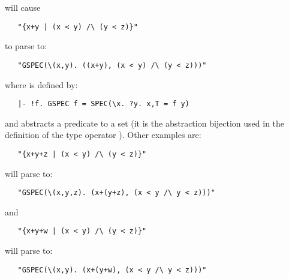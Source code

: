 \noindent will cause

\begin{hol}\begin{verbatim}
   "{x+y | (x < y) /\ (y < z)}"
\end{verbatim}\end{hol}

\noindent to parse to:

\begin{hol}\begin{verbatim}
   "GSPEC(\(x,y). ((x+y), (x < y) /\ (y < z)))"
\end{verbatim}\end{hol}

\noindent where  is defined by:

\begin{hol}\begin{verbatim}
   |- !f. GSPEC f = SPEC(\x. ?y. x,T = f y)
\end{verbatim}\end{hol}

\noindent and  abstracts a predicate to a set (it is the abstraction
bijection used in the definition of the type operator ).
Other examples are:

\begin{hol}\begin{verbatim}
   "{x+y+z | (x < y) /\ (y < z)}"
\end{verbatim}\end{hol}

\noindent will parse to:

\begin{hol}\begin{verbatim}
   "GSPEC(\(x,y,z). (x+(y+z), (x < y /\ y < z)))" 
\end{verbatim}\end{hol}

\noindent and

\begin{hol}\begin{verbatim}
   "{x+y+w | (x < y) /\ (y < z)}"
\end{verbatim}\end{hol}

\noindent will parse to:

\begin{hol}\begin{verbatim}
   "GSPEC(\(x,y). (x+(y+w), (x < y /\ y < z)))"
\end{verbatim}\end{hol}


